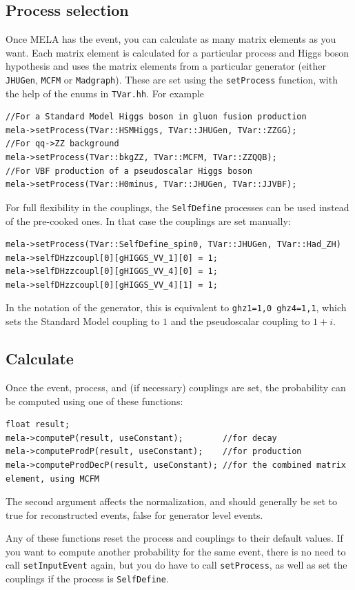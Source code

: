 \documentclass[aps,superscriptaddress,nofootinbib]{revtex4}
\begin{document}
\subsection{Process selection}
Once MELA has the event, you can calculate as many matrix elements as you want.  Each matrix element is calculated for a particular process and Higgs boson hypothesis and uses the matrix elements from a particular generator (either \texttt{JHUGen}, \texttt{MCFM} or \texttt{Madgraph}).  These are set using the \texttt{setProcess} function, with the help of the enums in \texttt{TVar.hh}.  For example
\begin{verbatim}
//For a Standard Model Higgs boson in gluon fusion production
mela->setProcess(TVar::HSMHiggs, TVar::JHUGen, TVar::ZZGG);
//For qq->ZZ background
mela->setProcess(TVar::bkgZZ, TVar::MCFM, TVar::ZZQQB);
//For VBF production of a pseudoscalar Higgs boson
mela->setProcess(TVar::H0minus, TVar::JHUGen, TVar::JJVBF);
\end{verbatim}

For full flexibility in the couplings, the \texttt{SelfDefine} processes can be used instead of the pre-cooked ones.  In that case the couplings are set manually:
\begin{verbatim}
mela->setProcess(TVar::SelfDefine_spin0, TVar::JHUGen, TVar::Had_ZH)
mela->selfDHzzcoupl[0][gHIGGS_VV_1][0] = 1;
mela->selfDHzzcoupl[0][gHIGGS_VV_4][0] = 1;
mela->selfDHzzcoupl[0][gHIGGS_VV_4][1] = 1;
\end{verbatim}
In the notation of the generator, this is equivalent to \texttt{ghz1=1,0 ghz4=1,1}, which sets the Standard Model coupling to $1$ and the pseudoscalar coupling to $1+i$.

\subsection{Calculate}
Once the event, process, and (if necessary) couplings are set, the probability can be computed using one of these functions:
\begin{verbatim}
float result;
mela->computeP(result, useConstant);        //for decay
mela->computeProdP(result, useConstant);    //for production
mela->computeProdDecP(result, useConstant); //for the combined matrix element, using MCFM
\end{verbatim}
The second argument affects the normalization, and should generally be set to true for reconstructed events, false for generator level events.

Any of these functions reset the process and couplings to their default values.  If you want to compute another probability for the same event, there is no need to call \texttt{setInputEvent} again, but you do have to call \texttt{setProcess}, as well as set the couplings if the process is \texttt{SelfDefine}.
\end{document}
